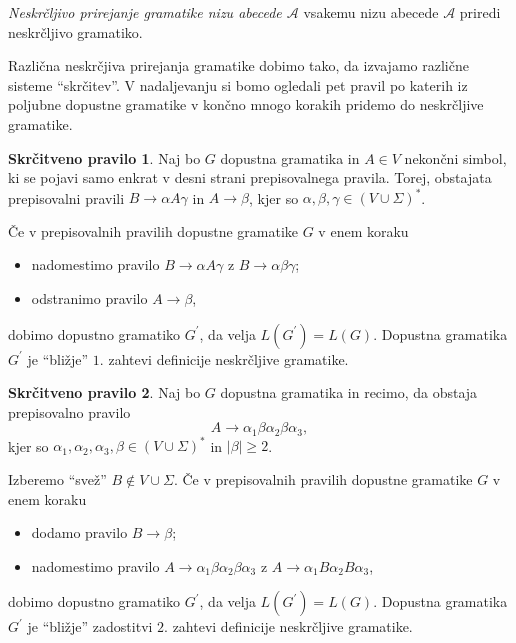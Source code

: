 \documentclass[fin1, tisk]{fmfdelo}
\providecommand{\abs}[1]{\left\lvert #1 \right\rvert}
\newcommand{\A}{\mathcal{A}}
\theoremstyle{definition}
\newtheorem{pravilo}{Skrčitveno pravilo}
\begin{document}
\begin{definicija}
    \emph{Neskrčljivo prirejanje gramatike nizu abecede $\A$} vsakemu nizu abecede $\A$ priredi
    neskrčljivo gramatiko.
\end{definicija}

Različna neskrčjiva prirejanja gramatike dobimo tako, da izvajamo različne sisteme ``skrčitev''.
V nadaljevanju si bomo ogledali pet pravil po katerih iz poljubne dopustne gramatike v končno 
mnogo korakih pridemo do neskrčljive gramatike.

\begin{pravilo}
    Naj bo $G$ dopustna gramatika in $A \in V$ nekončni simbol, ki se pojavi samo 
    enkrat v desni strani prepisovalnega pravila. Torej, obstajata prepisovalni pravili 
    $B \rightarrow \alpha A \gamma$ in $A \rightarrow \beta$, kjer so 
    $\alpha, \beta, \gamma \in (V \cup \Sigma)^*$.

    Če v prepisovalnih pravilih dopustne gramatike $G$ v enem koraku
    \begin{itemize}
        \item nadomestimo pravilo $B \rightarrow \alpha A \gamma$ z $B \rightarrow \alpha \beta \gamma$;
        \item odstranimo pravilo $ A \rightarrow \beta$,
    \end{itemize}
    dobimo dopustno gramatiko $G^\prime$, da velja $L(G^\prime) = L(G)$. Dopustna gramatika 
    $G^\prime$ je ``bližje'' $1.$ zahtevi definicije neskrčljive gramatike.
\end{pravilo}

\begin{pravilo}
    Naj bo $G$ dopustna gramatika in recimo, da obstaja prepisovalno pravilo
    \[
        A \rightarrow \alpha_1 \beta \alpha_2 \beta \alpha_3,
    \]
    kjer so $\alpha_1, \alpha_2, \alpha_3, \beta \in (V \cup \Sigma)^*$ in $\abs{\beta} \geq 2$.

    Izberemo ``svež'' $B \notin V \cup \Sigma$. Če v prepisovalnih pravilih dopustne gramatike $G$ v enem koraku
    \begin{itemize}
        \item dodamo pravilo $B \rightarrow \beta$;
        \item nadomestimo pravilo $A \rightarrow \alpha_1 \beta \alpha_2 \beta \alpha_3$ z 
        $A \rightarrow \alpha_1 B \alpha_2 B \alpha_3$,
    \end{itemize}
    dobimo dopustno gramatiko $G^\prime$, da velja $L(G^\prime) = L(G)$. Dopustna gramatika 
    $G^\prime$ je ``bližje'' zadostitvi $2.$ zahtevi definicije neskrčljive gramatike.
\end{pravilo}
\end{document}
